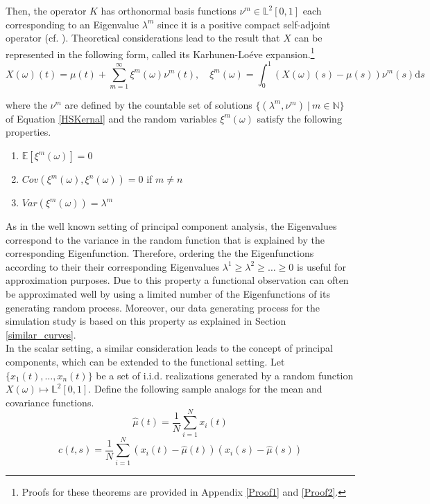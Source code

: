 \documentclass[11pt,twoside,a4paper]{article}
\begin{document}
	Then, the operator $K$ has orthonormal basis functions $\nu^{m} \in \mathbb{L}^{2}[0,1]$ each corresponding to an Eigenvalue $\lambda^{m}$ since it is a positive compact self-adjoint operator (cf. \cite{alexanderian_KLexpansion_2015}).
	Theoretical considerations lead to the result that $X$ can be represented in the following form, called its Karhunen-Lo\'{e}ve expansion.\footnote{Proofs for these theorems are provided in Appendix \ref{Proof1} and \ref{Proof2}.} 
	\begin{equation}\label{KarhunenLoeve}
		X(\omega)(t) = \mu(t) + \sum_{m = 1}^{\infty} \xi^m(\omega) \nu^m(t), \quad \xi^m(\omega) =  \int_{0}^{1} \left(X(\omega)(s) - \mu(s)\right) \nu^m(s) \mathrm{d}s
	\end{equation}

	where the $\nu^m$ are defined by the countable set of solutions $\{(\lambda^m, \nu^m) \: \vert \: m \in \mathbb{N}\}$ of Equation \ref{HSKernal} and the random variables $\xi^{m}(\omega)$ satisfy the following properties.
	\begin{multicols}{2}
		\begin{enumerate}
			\item $\mathbb{E}\left[\xi^m(\omega)\right] = 0$
			\item $Cov\left(\xi^m(\omega), \xi^n(\omega)\right) = 0$ if $m \neq n$
			\item $Var\left(\xi^m(\omega)\right) = \lambda^m$
		\end{enumerate}
	\end{multicols}

	As in the well known setting of principal component analysis, the Eigenvalues correspond to the variance in the random function that is explained by the corresponding Eigenfunction. 
	Therefore, ordering the the Eigenfunctions according to their their corresponding Eigenvalues $\lambda^{1} \geq \lambda^{2} \geq \dots \geq 0$ is useful for approximation purposes. Due to this property a functional observation can often be approximated well by using a limited number of the Eigenfunctions of its generating random process. Moreover, our data generating process for the simulation study is based on this property as explained in Section \ref{similar_curves}.\\
	In the scalar setting, a similar consideration leads to the concept of principal components, which can be extended to the functional setting. Let $\{x_1(t), \dots, x_n(t)\}$ be a set of i.i.d. realizations generated by a random function $X(\omega) \mapsto \mathbb{L}^2[0,1]$.
	Define the following sample analogs for the mean and covariance functions.
	\begin{equation}
		\hat{\mu}(t) = \frac{1}{N}\sum_{i = 1}^{N}x_i(t)
	\end{equation}
	\begin{equation}
		\hat{c}(t,s) = \frac{1}{N} \sum_{i = 1}^{N} \left(x_i(t) - \hat{\mu}(t)\right) \left(x_i(s) - \hat{\mu}(s)\right)
	\end{equation}
	
\end{document}
